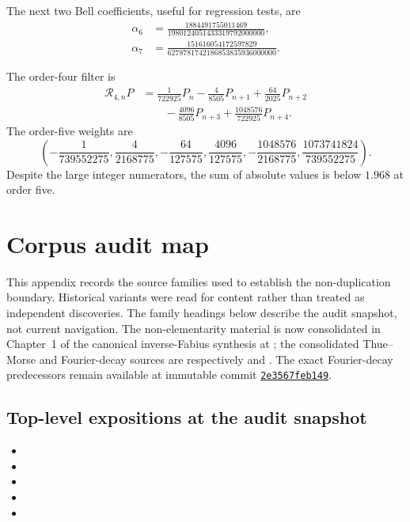 \documentclass[11pt,oneside]{article}
\numberwithin{equation}{section}
\theoremstyle{definition}
\theoremstyle{remark}
\begin{document}
The next two Bell coefficients, useful for regression tests, are
\begin{align*}
 \alpha_6&=\frac{1884491755011469}
 {1980124051433319792000000},\\
 \alpha_7&=\frac{151616054172597829}
 {6278781742186853835936000000}.
\end{align*}

The order-four filter is
\begin{align*}
 \mathcal R_{4,n}P
 &=\frac1{722925}P_n-\frac4{8505}P_{n+1}
 +\frac{64}{2025}P_{n+2}\\
 &\qquad-\frac{4096}{8505}P_{n+3}
 +\frac{1048576}{722925}P_{n+4}.
\end{align*}
The order-five weights are
\[
 \left(
 -\frac1{739552275},\frac4{2168775},-\frac{64}{127575},
 \frac{4096}{127575},-\frac{1048576}{2168775},
 \frac{1073741824}{739552275}
 \right).
\]
Despite the large integer numerators, the sum of absolute values is below
\(1.968\) at order five.

\section{Corpus audit map}
\label{p2:app:corpus}

This appendix records the source families used to establish the non-duplication
boundary. Historical variants were read for content rather than treated as
independent discoveries.  The family headings below describe the audit
snapshot, not current navigation.  The non-elementarity material is now
consolidated in Chapter~1 of the canonical inverse-Fabius synthesis at
;
the consolidated Thue--Morse and Fourier-decay sources are respectively
and
.
The exact Fourier-decay predecessors remain available at immutable commit
\href{https://github.com/VladimirReshetnikov/ProveIt/tree/2e3567feb14947ee3ebcdab11adca64e746ad26f}{\texttt{2e3567feb149}}.

\begingroup
\small
\raggedright
\subsection*{Top-level expositions at the audit snapshot}
\begin{itemize}[leftmargin=8mm]
\item {}
\item {}
\item {}
\item {}
\item {}
\end{itemize}
\end{document}
